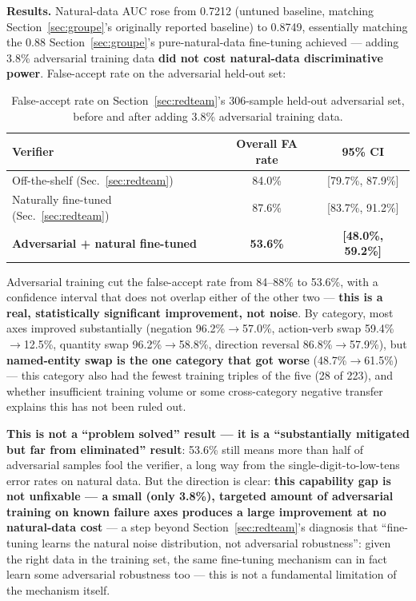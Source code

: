 \documentclass[11pt]{article}
\newenvironment{fittab}{\begin{lrbox}{\fittabbox}}{\end{lrbox}%
  \ifdim\wd\fittabbox>\linewidth\resizebox{\linewidth}{!}{\usebox{\fittabbox}}\else\usebox{\fittabbox}\fi}
\begin{document}
\textbf{Results.} Natural-data AUC rose from 0.7212 (untuned baseline, matching Section~\ref{sec:groupe}'s originally reported baseline) to 0.8749, essentially matching the 0.88 Section~\ref{sec:groupe}'s pure-natural-data fine-tuning achieved --- adding 3.8\% adversarial training data \textbf{did not cost natural-data discriminative power}. False-accept rate on the adversarial held-out set:

\begin{table}[h]
\centering
\small
\begin{fittab}\begin{tabular}{@{}lcc@{}}
\toprule
\textbf{Verifier} & \textbf{Overall FA rate} & \textbf{95\% CI} \\
\midrule
Off-the-shelf (Sec.~\ref{sec:redteam}) & 84.0\% & [79.7\%, 87.9\%] \\
Naturally fine-tuned (Sec.~\ref{sec:redteam}) & 87.6\% & [83.7\%, 91.2\%] \\
\textbf{Adversarial + natural fine-tuned} & \textbf{53.6\%} & \textbf{[48.0\%, 59.2\%]} \\
\bottomrule
\end{tabular}\end{fittab}
\caption{False-accept rate on Section~\ref{sec:redteam}'s 306-sample held-out adversarial set, before and after adding 3.8\% adversarial training data.}
\end{table}

Adversarial training cut the false-accept rate from 84--88\% to 53.6\%, with a confidence interval that does not overlap either of the other two --- \textbf{this is a real, statistically significant improvement, not noise}. By category, most axes improved substantially (negation 96.2\%$\to$57.0\%, action-verb swap 59.4\%$\to$12.5\%, quantity swap 96.2\%$\to$58.8\%, direction reversal 86.8\%$\to$57.9\%), but \textbf{named-entity swap is the one category that got worse} (48.7\%$\to$61.5\%) --- this category also had the fewest training triples of the five (28 of 223), and whether insufficient training volume or some cross-category negative transfer explains this has not been ruled out.

\textbf{This is not a ``problem solved'' result --- it is a ``substantially mitigated but far from eliminated'' result}: 53.6\% still means more than half of adversarial samples fool the verifier, a long way from the single-digit-to-low-tens error rates on natural data. But the direction is clear: \textbf{this capability gap is not unfixable --- a small (only 3.8\%), targeted amount of adversarial training on known failure axes produces a large improvement at no natural-data cost} --- a step beyond Section~\ref{sec:redteam}'s diagnosis that ``fine-tuning learns the natural noise distribution, not adversarial robustness'': given the right data in the training set, the same fine-tuning mechanism can in fact learn some adversarial robustness too --- this is not a fundamental limitation of the mechanism itself.
\end{document}
